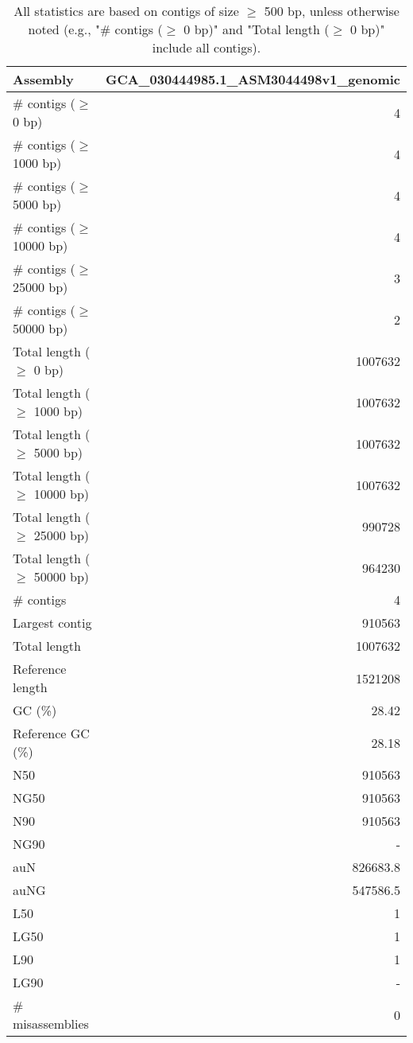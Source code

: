 \documentclass[12pt,a4paper]{article}
\begin{document}
\begin{table}[ht]
\begin{center}
\caption{All statistics are based on contigs of size $\geq$ 500 bp, unless otherwise noted (e.g., "\# contigs ($\geq$ 0 bp)" and "Total length ($\geq$ 0 bp)" include all contigs).}
\begin{tabular}{|l*{1}{|r}|}
\hline
Assembly & GCA\_030444985.1\_ASM3044498v1\_genomic \\ \hline
\# contigs ($\geq$ 0 bp) & 4 \\ \hline
\# contigs ($\geq$ 1000 bp) & 4 \\ \hline
\# contigs ($\geq$ 5000 bp) & 4 \\ \hline
\# contigs ($\geq$ 10000 bp) & 4 \\ \hline
\# contigs ($\geq$ 25000 bp) & 3 \\ \hline
\# contigs ($\geq$ 50000 bp) & 2 \\ \hline
Total length ($\geq$ 0 bp) & 1007632 \\ \hline
Total length ($\geq$ 1000 bp) & 1007632 \\ \hline
Total length ($\geq$ 5000 bp) & 1007632 \\ \hline
Total length ($\geq$ 10000 bp) & 1007632 \\ \hline
Total length ($\geq$ 25000 bp) & 990728 \\ \hline
Total length ($\geq$ 50000 bp) & 964230 \\ \hline
\# contigs & 4 \\ \hline
Largest contig & 910563 \\ \hline
Total length & 1007632 \\ \hline
Reference length & 1521208 \\ \hline
GC (\%) & 28.42 \\ \hline
Reference GC (\%) & 28.18 \\ \hline
N50 & 910563 \\ \hline
NG50 & 910563 \\ \hline
N90 & 910563 \\ \hline
NG90 & - \\ \hline
auN & 826683.8 \\ \hline
auNG & 547586.5 \\ \hline
L50 & 1 \\ \hline
LG50 & 1 \\ \hline
L90 & 1 \\ \hline
LG90 & - \\ \hline
\# misassemblies & 0 \\ \hline

\end{tabular}
\end{center}
\end{table}
\end{document}
